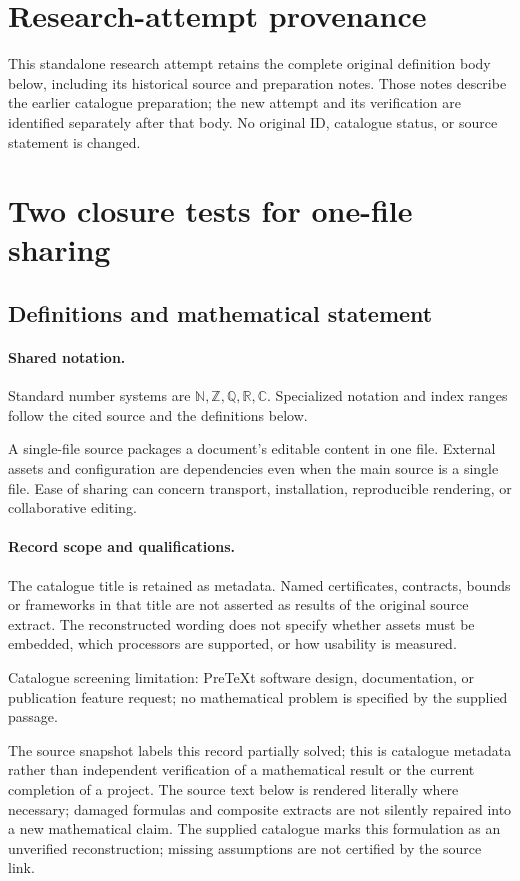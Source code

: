 \documentclass[11pt]{article}
\begin{document}
\section*{Research-attempt provenance}
This standalone research attempt retains the complete original definition body below,
including its historical source and preparation notes. Those notes describe the
earlier catalogue preparation; the new attempt and its verification are identified
separately after that body. No original ID, catalogue status, or source statement is changed.

\section{Two closure tests for one-file sharing}\label{statement}

\subsection{Definitions and mathematical statement}

\paragraph{Shared notation.}Standard number systems are $\mathbb N,\mathbb Z,\mathbb Q,\mathbb R,\mathbb C$. Specialized notation and index ranges follow the cited source and the definitions below.


A single-file source packages a document's editable content in one file. External assets and configuration are dependencies even when the main source is a single file. Ease of sharing can concern transport, installation, reproducible rendering, or collaborative editing.
\paragraph{Record scope and qualifications.}
The catalogue title is retained as metadata. Named certificates, contracts, bounds or frameworks in that title are not asserted as results of the original source extract.
The reconstructed wording does not specify whether assets must be embedded, which processors are supported, or how usability is measured.

Catalogue screening limitation: PreTeXt software design, documentation, or publication feature request; no mathematical problem is specified by the supplied passage.

The source snapshot labels this record partially solved; this is catalogue metadata rather than independent verification of a mathematical result or the current completion of a project.
The source text below is rendered literally where necessary; damaged formulas and composite extracts are not silently repaired into a new mathematical claim.
The supplied catalogue marks this formulation as an unverified reconstruction; missing assumptions are not certified by the source link.
\end{document}
